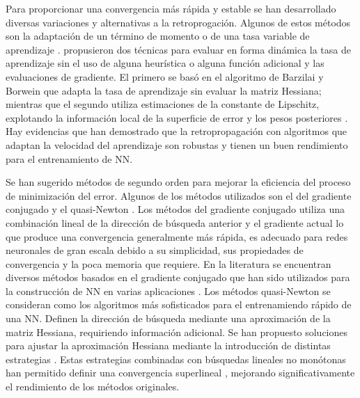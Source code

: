 Para proporcionar una convergencia más rápida y estable se han desarrollado diversas variaciones y alternativas a la retroprogación. Algunos de estos métodos son la adaptación de un término de momento \cite{Jacobs1988, Rumelhart1986b} o de una tasa variable de aprendizaje \cite{Jacobs1988, Vogl1988}.  propusieron dos técnicas para evaluar en forma dinámica la tasa de aprendizaje sin el uso de alguna heurística o alguna función adicional y las evaluaciones de gradiente. El primero se basó en el algoritmo de Barzilai y Borwein \cite{Barzilai1988} que adapta la tasa de aprendizaje sin evaluar la matriz Hessiana; mientras que el segundo utiliza estimaciones de la constante de Lipschitz, explotando la información local de la superficie de error y los pesos posteriores \cite{Magoulas1997}. Hay evidencias \cite{Magoulas1997, Plagianakos2002, Plagianakos1998} que han demostrado que la retropropagación con algoritmos que adaptan la velocidad del aprendizaje son robustas y tienen un buen rendimiento para el entrenamiento de NN.

Se han sugerido métodos de segundo orden  para mejorar la eficiencia del proceso de minimización del error. Algunos de los métodos utilizados son el del gradiente conjugado \cite{Fletcher1964, Hestenes1952, Polak1969} y el quasi-Newton \cite{Huang1970, Nocedal2006}. Los métodos del gradiente conjugado utiliza una combinación lineal de la dirección de búsqueda anterior y el gradiente actual lo que produce una convergencia generalmente más rápida, es adecuado para redes neuronales de gran escala debido a su simplicidad, sus propiedades de convergencia y la poca memoria que requiere. En la literatura  se encuentran diversos métodos basados en el gradiente conjugado \cite{Birgin2001, Moller1993} que han sido utilizados para la construcción de NN en varias aplicaciones \cite{Charalambous1992, Peng2007, Sotiropoulos2002}. Los métodos quasi-Newton se consideran como los algoritmos más sofisticados para el entrenamiendo rápido de una NN. Definen la dirección de búsqueda mediante una aproximación de la matriz Hessiana, requiriendo información adicional. Se han propuesto soluciones para ajustar la aproximación Hessiana mediante la introducción de distintas estrategias \cite{Al-Baali1998, Nocedal1993, Oren1972, Oren1974, Yin2007}. Estas estrategias combinadas con búsquedas lineales no monótonas han permitido definir una convergencia superlineal \cite{Yin2007}, mejorando significativamente el rendimiento de los métodos originales.

